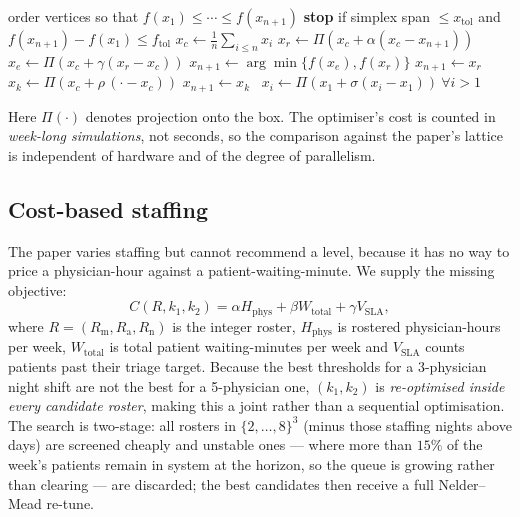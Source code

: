 \documentclass[sigconf,nonacm]{acmart}
\begin{document}
\begin{algorithm}[t]
\caption{Nelder--Mead iteration (minimisation)}
\label{alg:nm}
\begin{algorithmic}[1]
\State order vertices so that $f(x_1)\le\cdots\le f(x_{n+1})$
\State \textbf{stop} if simplex span $\le x_{\text{tol}}$ and
       $f(x_{n+1})-f(x_1)\le f_{\text{tol}}$
\State $x_c \gets \frac{1}{n}\sum_{i\le n} x_i$ 
\State $x_r \gets \Pi\!\left(x_c + \alpha (x_c - x_{n+1})\right)$ 
  \State $x_e \gets \Pi\!\left(x_c + \gamma (x_r - x_c)\right)$ 
  \State $x_{n+1} \gets \arg\min\{f(x_e),f(x_r)\}$
  \State $x_{n+1} \gets x_r$
\Else
  \State $x_k \gets \Pi\!\left(x_c + \rho\,(\cdot - x_c)\right)$ 
   $x_{n+1} \gets x_k$
  \Else\ $x_i \gets \Pi\!\left(x_1 + \sigma (x_i - x_1)\right)\ \forall i>1$
  \EndIf
\EndIf
\end{algorithmic}
\end{algorithm}

Here $\Pi(\cdot)$ denotes projection onto the box. The optimiser's cost is
counted in \emph{week-long simulations}, not seconds, so the comparison against
the paper's lattice is independent of hardware and of the degree of
parallelism.

\subsection{Cost-based staffing}
\label{sec:cost}
The paper varies staffing but cannot recommend a level, because it has no way
to price a physician-hour against a patient-waiting-minute. We supply the
missing objective:
\begin{equation}
C(R,k_1,k_2) = \alpha H_{\text{phys}} + \beta W_{\text{total}}
             + \gamma V_{\text{SLA}} ,
\label{eq:cost}
\end{equation}
where $R=(R_{\text{m}},R_{\text{a}},R_{\text{n}})$ is the integer roster,
$H_{\text{phys}}$ is rostered physician-hours per week, $W_{\text{total}}$ is
total patient waiting-minutes per week and $V_{\text{SLA}}$ counts patients
past their triage target. Because the best thresholds for a 3-physician night
shift are not the best for a 5-physician one, $(k_1,k_2)$ is \emph{re-optimised
inside every candidate roster}, making this a joint rather than a sequential
optimisation. The search is two-stage: all rosters in $\{2,\dots,8\}^3$ (minus
those staffing nights above days) are screened cheaply and unstable ones ---
where more than $15\%$ of the week's patients remain in system at the horizon,
so the queue is growing rather than clearing --- are discarded; the best
candidates then receive a full Nelder--Mead re-tune.
\end{document}
